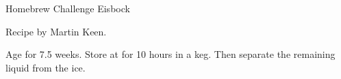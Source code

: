 \stylesection{\styleeisbock}

\begin{recipe}{Homebrew Challenge Eisbock}

\begin{aboutblock}
Recipe by Martin Keen.
\sourcehomebrewchallenge
\end{aboutblock}


\begin{methodandtiming}

\begin{mashsteps}
\end{mashsteps}

\begin{fermentationsteps}
\end{fermentationsteps}

\begin{directions}
Age for 7.5 weeks. Store at  for 10 hours in a keg. Then separate the
remaining liquid from the ice.
\end{directions}

\end{methodandtiming}

\recipebreak

\begin{ingredientsblock}

\begin{malts}
\end{malts}

\begin{hops}
\end{hops}


\end{ingredientsblock}

\end{recipe}
